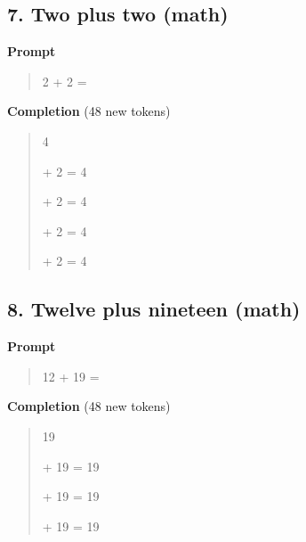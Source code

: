 \documentclass[10pt,a4paper]{article}
\begin{document}
\subsection*{7. Two plus two (math)}
\textbf{Prompt}\par
\begin{quote}\small\raggedright  2 + 2 =\par\end{quote}
\textbf{Completion} (48 new tokens)\par
\begin{quote}\small\raggedright  \hspace*{0.5em}4\par\noindent \mbox{}\par{} + 2 = 4\par\noindent \mbox{}\par{} + 2 = 4\par\noindent \mbox{}\par{} + 2 = 4\par\noindent \mbox{}\par{} + 2 = 4\par\noindent \mbox{}\par\noindent \mbox{}\par\end{quote}
\filbreak
\subsection*{8. Twelve plus nineteen (math)}
\textbf{Prompt}\par
\begin{quote}\small\raggedright  12 + 19 =\par\end{quote}
\textbf{Completion} (48 new tokens)\par
\begin{quote}\small\raggedright  \hspace*{0.5em}19\par\noindent \mbox{}\par{} + 19 = 19\par\noindent \mbox{}\par{} + 19 = 19\par\noindent \mbox{}\par{} + 19 = 19\par\noindent \mbox{}\par{}\par\end{quote}
\filbreak
\end{document}
